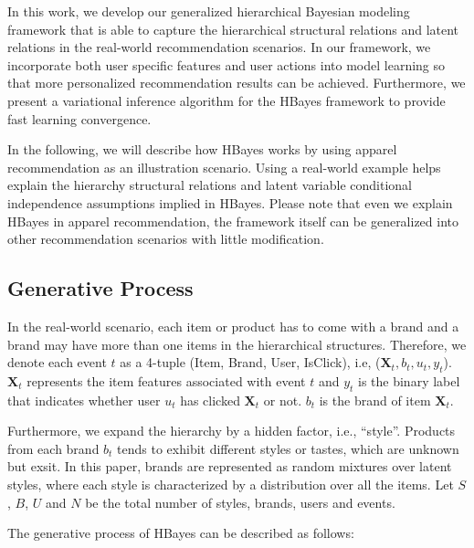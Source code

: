 In this work, we develop our generalized hierarchical Bayesian modeling framework that is able to capture the hierarchical structural relations and latent relations in the real-world recommendation scenarios. In our framework, we incorporate both user specific features and user actions into model learning so that more personalized recommendation results can be achieved. Furthermore, we present a variational inference algorithm for the HBayes framework to provide fast learning convergence.

In the following, we will describe how HBayes works by using apparel recommendation as an illustration scenario. Using a real-world example helps explain the hierarchy structural relations and latent variable conditional independence assumptions implied in HBayes. Please note that even we explain HBayes in apparel recommendation, the framework itself can be generalized into other recommendation scenarios with little modification. 



\subsection{Generative Process}

In the real-world scenario, each item or product has to come with a brand and a brand may have more than one items in the hierarchical structures. Therefore, we denote each event $t$ as a 4-tuple (Item, Brand, User, IsClick), i.e, ($\mathbf{X}_t, b_t, u_t, y_t$). $\mathbf{X}_t$ represents the item features associated with event $t$ and $y_t$ is the binary label that indicates whether user $u_t$ has clicked $\mathbf{X}_t$ or not. $b_t$ is the brand of item $\mathbf{X}_t$. 

Furthermore, we expand the hierarchy by a hidden factor, i.e., ``style''. Products from each brand $b_t$ tends to exhibit different styles or tastes, which are unknown but exsit. In this paper, brands are represented as random mixtures over latent styles, where each style is characterized by a distribution over all the items. Let $S$, $B$, $U$ and $N$ be the total number of styles, brands, users and events.

The generative process of HBayes can be described as follows:

